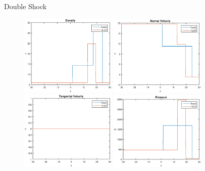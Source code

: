 \documentclass{beamer}
\begin{document}
\begin{frame}{Double Shock}
\begin{figure}[ht]
\centering
\includegraphics[width=1.8in]{dubShockDen}
\includegraphics[width=1.8in]{dubShockU}\\
\includegraphics[width=1.8in]{dubShockV}
\includegraphics[width=1.8in]{dubShockP}
\end{figure}
\end{frame}
\end{document}

